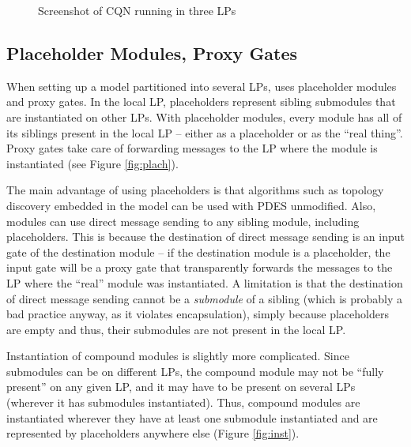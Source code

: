 

\begin{figure}[htbp]
  \begin{center}
    \caption{Screenshot of CQN running in three LPs}
    \label{fig:parsim-screenshot}
  \end{center}
\end{figure}



\subsection{Placeholder Modules, Proxy Gates}
\label{sec:parallel-exec:placeholder-modules-proxy-gates}

When setting up a model partitioned into several LPs,
{\opp} uses placeholder modules and proxy gates.
In the local LP, placeholders represent sibling submodules
that are instantiated on other LPs.
With placeholder modules, every module has all of its siblings
present in the local LP -- either as a placeholder or as the ``real thing''.
Proxy gates take care of forwarding messages to the LP where
the module is instantiated (see Figure \ref{fig:plach}).

The main advantage of using placeholders is that algorithms such as
topology discovery embedded in the model can be used with PDES unmodified.
Also, modules can use direct message sending to any sibling module,
including placeholders. This is because the destination of direct message
sending is an input gate of the destination module -- if the destination
module is a placeholder, the input gate will be a proxy gate that
transparently forwards the messages to the LP where the ``real'' module
was instantiated. A limitation is that the destination of direct message
sending cannot be a \textit{submodule} of a sibling (which is
probably a bad practice anyway, as it violates encapsulation),
simply because placeholders are empty and thus, their submodules are
not present in the local LP.

Instantiation of compound modules is slightly more complicated.
Since submodules can be on different LPs, the compound module may
not be ``fully present'' on any given LP, and it may have to be
present on several LPs (wherever it has submodules instantiated).
Thus, compound modules are instantiated wherever they have
at least one submodule instantiated and are represented by placeholders
anywhere else (Figure \ref{fig:inst}).


